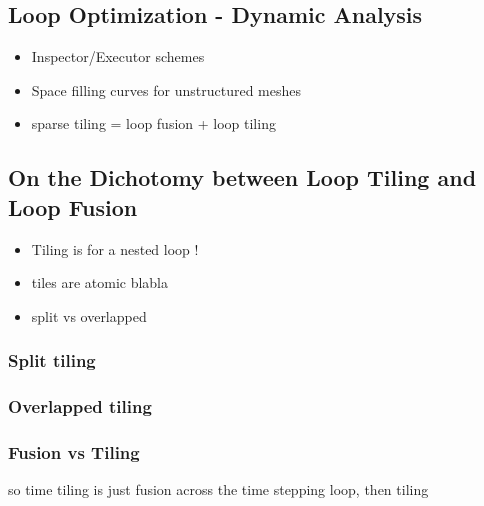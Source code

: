\subsection{Loop Optimization - Dynamic Analysis}
\label{sec:bkg:ie}
\begin{itemize}
\item Inspector/Executor schemes
\item Space filling curves for unstructured meshes
\item sparse tiling = loop fusion + loop tiling
\end{itemize}


\subsection{On the Dichotomy between Loop Tiling and Loop Fusion}
\label{sec:bkg:tiling}

\begin{itemize}
\item Tiling is for a nested loop ! 
\item tiles are atomic blabla
\item split vs overlapped
\end{itemize}


\subsubsection{Split tiling}

\subsubsection{Overlapped tiling}
 
 \subsubsection{Fusion vs Tiling}
 so time tiling is just fusion across the time stepping loop, then tiling

